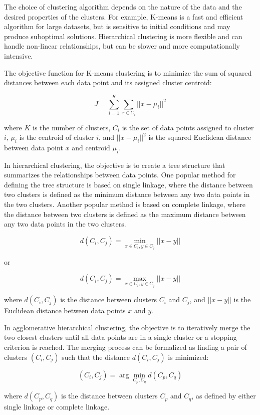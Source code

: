\documentclass[12pt, a4paper, oneside]{article}
\begin{document}
The choice of clustering algorithm depends on the nature of the data and the desired properties of the clusters. For example, K-means is a fast and efficient algorithm for large datasets, but is sensitive to initial conditions and may produce suboptimal solutions. Hierarchical clustering is more flexible and can handle non-linear relationships, but can be slower and more computationally intensive.

The objective function for K-means clustering is to minimize the sum of squared distances between each data point and its assigned cluster centroid:

$$ J = \sum_{i=1}^K \sum_{x \in C_i} ||x - \mu_i||^2 $$

where $K$ is the number of clusters, $C_i$ is the set of data points assigned to cluster $i$, $\mu_i$ is the centroid of cluster $i$, and $||x - \mu_i||^2$ is the squared Euclidean distance between data point $x$ and centroid $\mu_i$.

In hierarchical clustering, the objective is to create a tree structure that summarizes the relationships between data points. One popular method for defining the tree structure is based on single linkage, where the distance between two clusters is defined as the minimum distance between any two data points in the two clusters. Another popular method is based on complete linkage, where the distance between two clusters is defined as the maximum distance between any two data points in the two clusters.

$$ d(C_i, C_j) = \min_{x \in C_i, y \in C_j} ||x - y|| $$

or

$$ d(C_i, C_j) = \max_{x \in C_i, y \in C_j} ||x - y|| $$

where $d(C_i, C_j)$ is the distance between clusters $C_i$ and $C_j$, and $||x - y||$ is the Euclidean distance between data points $x$ and $y$.

In agglomerative hierarchical clustering, the objective is to iteratively merge the two closest clusters until all data points are in a single cluster or a stopping criterion is reached. The merging process can be formalized as finding a pair of clusters $(C_i, C_j)$ such that the distance $d(C_i, C_j)$ is minimized:

$$ (C_i, C_j) = \arg \min_{C_p, C_q} d(C_p, C_q) $$

where $d(C_p, C_q)$ is the distance between clusters $C_p$ and $C_q$, as defined by either single linkage or complete linkage.
\end{document}
